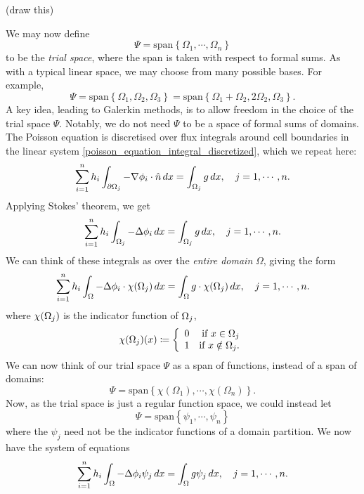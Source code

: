 \vskip 0.2in
(draw this)
\vskip 0.2in

We may now define
    $$\Psi = \text{span}\left\{\Omega_1,\cdots,\Omega_n\right\}$$
to be the \textit{trial space}, where the span is taken with respect to formal sums. As with a typical linear space,
we may choose from many possible bases. For example,
    $$\Psi = \text{span}\left\{\Omega_1, \Omega_2, \Omega_3\right\} =
    \text{span}\left\{\Omega_1 + \Omega_2, 2\Omega_2, \Omega_3\right\}.$$
A key idea, leading to Galerkin methods, is to allow freedom in the choice of the trial space $\Psi$.
Notably, we do not need $\Psi$ to be a space of formal sums of domains.
The Poisson equation is discretised over flux integrals around cell boundaries in the linear system \eqref{poisson_equation_integral_discretized},
which we repeat here:
\begin{align*}
    \sum_{i=1}^n h_i\int_{{\partial\Omega}_j} -\nabla \phi_i \cdot \hat{n}\,dx = \int_{{\Omega}_j} g\,dx,\quad j=1,\cdots,n.
\end{align*}
Applying Stokes' theorem, we get
\begin{align*}
    \sum_{i=1}^n h_i\int_{{\Omega}_j} -\Delta \phi_i \,dx = \int_{{\Omega}_j} g\,dx,\quad j=1,\cdots,n.
\end{align*}
We can think of these integrals as over the \textit{entire domain} $\Omega$, giving the form
\begin{align*}
    \sum_{i=1}^n h_i\int_{{\Omega}} -\Delta \phi_i\cdot \chi({\Omega}_j)\,dx = \int_{{\Omega}} g\cdot\chi({\Omega}_j)\,dx,\quad j=1,\cdots,n.
\end{align*}
where $\chi({\Omega}_j)$ is the indicator function of ${\Omega}_j$,
\begin{align*}
    \chi({\Omega}_j)(x) \coloneqq \left\{\begin{array}{lr}
        0 &\text{if $x \in {\Omega}_j$}\\
        1 &\text{if $x \notin {\Omega}_j$.}\\
        \end{array}\right.
\end{align*}
We can now think of our trial space $\Psi$ as a span of functions, instead of a span of domains:
    $$\Psi = \text{span}\left\{\chi(\Omega_1),\cdots,\chi(\Omega_n)\right\}.$$
Now, as the trial space is just a regular function space, we could instead let
    $$\Psi = \text{span}\left\{\psi_1,\cdots,\psi_n\right\}$$
where the $\psi_j$
need not be the indicator functions of a domain partition. We now have the system of equations
\begin{align*}
    \sum_{i=1}^n h_i\int_{{\Omega}} -\Delta \phi_i \psi_j\,dx = \int_{{\Omega}} g\psi_j\,dx,\quad j=1,\cdots,n.
\end{align*}
